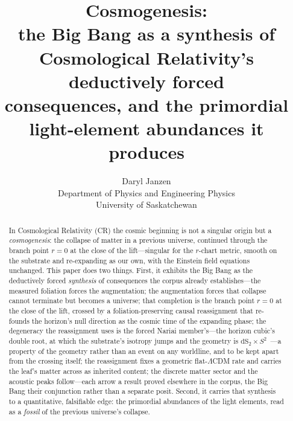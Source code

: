 \documentclass[11pt,a4paper]{article}
\title{Cosmogenesis:\\
\large the Big Bang as a synthesis of Cosmological Relativity's deductively forced\\
consequences, and the primordial light-element abundances it produces}
\author{Daryl Janzen\\
\small Department of Physics and Engineering Physics\\
\small University of Saskatchewan}
\date{}
\theoremstyle{plain}
\theoremstyle{definition}
\theoremstyle{remark}
\newcommand{\dS}{\mathrm{dS}}
\begin{document}
\maketitle

\begin{abstract}
In Cosmological Relativity (CR) the cosmic beginning is not a singular origin but a
\emph{cosmogenesis}: the collapse of matter in a previous universe, continued through the branch point $r=0$ at the close of the lift---singular for the $r$-chart metric, smooth on the substrate and re-expanding as our own, with the
Einstein field equations unchanged. This paper does two things. First, it exhibits the
Big Bang as the deductively forced \emph{synthesis} of consequences the corpus already
establishes---the measured foliation forces the augmentation; the augmentation forces
that collapse cannot terminate but becomes a universe; that completion is the branch point $r=0$ at the close of the lift, crossed by a
foliation-preserving causal reassignment that re-founds the horizon's null direction as the cosmic time of the expanding phase; the degeneracy the reassignment uses is the forced Nariai member's---the horizon cubic's double root, at which the substrate's isotropy jumps and the geometry is $\dS_2\times S^2$~\cite{JanzenAlgebroid}---a property of the geometry rather than an event on any worldline, and to be kept apart from the crossing itself; the reassignment fixes a
geometric flat-$\Lambda$CDM rate and carries the leaf's matter across as inherited
content; the discrete matter sector and the acoustic peaks follow---each arrow a result
proved elsewhere in the corpus, the Big Bang their conjunction rather than a separate
posit. Second, it carries that synthesis to a quantitative, falsifiable edge: the
primordial abundances of the light elements, read as a \emph{fossil} of the previous
universe's collapse.


\end{abstract}
\end{document}
